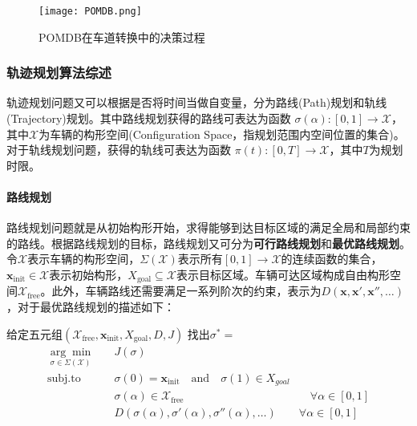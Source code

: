       \begin{figure}[htbp]
      \centering
      \texttt{[image: POMDB.png]}
      \caption[POMDB在车道转换中的决策过程]{POMDB在车道转换中的决策过程\cite{Ulbrich2013Probabilistic}}
      \label{fig:POMDB}
      \end{figure}

    \subsubsection{轨迹规划算法综述}
    \label{sec:trajectory}
      轨迹规划问题又可以根据是否将时间当做自变量，分为路线(Path)规划和轨线(Trajectory)规划。其中路线规划获得的路线可表达为函数 $\sigma(\alpha): [0,1]\rightarrow \mathcal{X}$，其中$\mathcal{X}$为车辆的构形空间(Configuration Space，指规划范围内空间位置的集合)。对于轨线规划问题，获得的轨线可表达为函数 $\pi(t): [0, T]\rightarrow \mathcal{X}$，其中$T$为规划时限。

      \paragraph{路线规划} 路线规划问题就是从初始构形开始，求得能够到达目标区域的满足全局和局部约束的路线。根据路线规划的目标，路线规划又可分为\textbf{可行路线规划}和\textbf{最优路线规划}。令$\mathcal{X}$表示车辆的构形空间，$\Sigma(\mathcal{X})$表示所有$[0,1]\rightarrow \mathcal{X}$的连续函数的集合，$\mathbf{x}_{\mathrm{init}}\in \mathcal{X}$表示初始构形，$X_{\mathrm{goal}}\subseteq \mathcal{X}$表示目标区域。车辆可达区域构成自由构形空间$\mathcal{X}_{\mathrm{free}}$。此外，车辆路线还需要满足一系列阶次的约束，表示为$D(\mathbf{x},\mathbf{x}',\mathbf{x}'', \dots)$，对于最优路线规划的描述如下：

      \begin{definition}[最优路线规划]
      \label{def:path}
      给定五元组$(\mathcal{X}_{\mathrm{free}}, \mathbf{x}_{\mathrm{init}}, X_{\mathrm{goal}}, D, J)$ 找出$\sigma^*=$
      \begin{equation}
      \begin{aligned}
      \underset{\sigma\in \Sigma(\mathcal{X})}{\arg\min}\quad & J(\sigma) & \\
      \mathrm{subj. to} \quad & \sigma(0)=\mathbf{x}_{\mathrm{init}} \quad \mathrm{and} \quad \sigma(1)\in X_{goal} & \\
      \quad & \sigma(\alpha)\in \mathcal{X}_{\mathrm{free}} & \quad \forall \alpha\in [0,1]\\
      & D(\sigma(\alpha),\sigma'(\alpha),\sigma''(\alpha), \dots) & \forall \alpha\in [0,1]
      \end{aligned}
      \end{equation}
      \end{definition}

